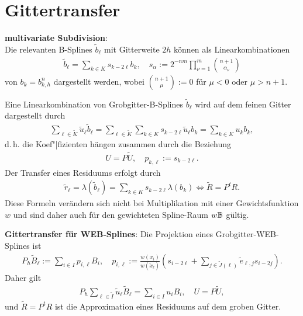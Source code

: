 \pagebreak

\section{%
    Gittertransfer%
}

\textbf{multivariate Subdivision}:\\
Die relevanten B-Splines $\widetilde{b}_\ell$ mit Gitterweite $2h$ können als Linearkombinationen
\begin{align*}
    \widetilde{b}_\ell = \sum_{k \in K} s_{k-2\ell} b_k,\quad
    s_\alpha := 2^{-nm} \prod_{\nu=1}^m \binom{n+1}{\alpha_\nu}
\end{align*}
von $b_k = b_{k,h}^n$ dargestellt werden,
wobei $\binom{n+1}{\mu} := 0$ für $\mu < 0$ oder $\mu > n + 1$.

Eine Linearkombination von Grobgitter-B-Splines $\widetilde{b}_\ell$ wird auf dem feinen Gitter
dargestellt durch
\begin{align*}
    \sum_{\ell \in \widetilde{K}} \widetilde{u}_\ell \widetilde{b}_\ell
    = \sum_{\ell \in \widetilde{K}} \sum_{k \in K} s_{k-2\ell} \widetilde{u}_\ell b_k
    = \sum_{k \in K} u_k b_k,
\end{align*}
d.\,h. die Koef"|fizienten hängen zusammen durch die Beziehung
\begin{align*}
    U = P \widetilde{U},\quad
    p_{k,\ell} := s_{k-2\ell}.
\end{align*}
Der Transfer eines Residuums erfolgt durch
\begin{align*}
    \widetilde{r}_\ell
    = \lambda(\widetilde{b}_\ell)
    = \sum_{k \in K} s_{k-2\ell} \lambda(b_k)
    \iff
    \widetilde{R} = P^t R.
\end{align*}
Diese Formeln verändern sich nicht bei Multiplikation mit einer Gewichtsfunktion $w$ und sind
daher auch für den gewichteten Spline-Raum $w\mathbb{B}$ gültig.

\linie

\textbf{Gittertransfer für WEB-Splines}:
Die Projektion eines Grobgitter-WEB-Splines ist
\begin{align*}
    P_h \widetilde{B}_\ell
    := \sum_{i \in I} p_{i,\ell} B_i,\quad
    p_{i,\ell} := \frac{w(x_i)}{w(\widetilde{x}_\ell)}
    \left(s_{i-2\ell} + \sum_{j \in \widetilde{J}(\ell)} \widetilde{e}_{\ell,j} s_{i-2j}\right).
\end{align*}
Daher gilt
\begin{align*}
    P_h \sum_{\ell \in \widetilde{I}} \widetilde{u}_\ell \widetilde{B}_\ell
    = \sum_{i \in I} u_i B_i,\quad
    U = P \widetilde{U},
\end{align*}
und $\widetilde{R} = P^t R$ ist die Approximation eines Residuums auf dem groben Gitter.

